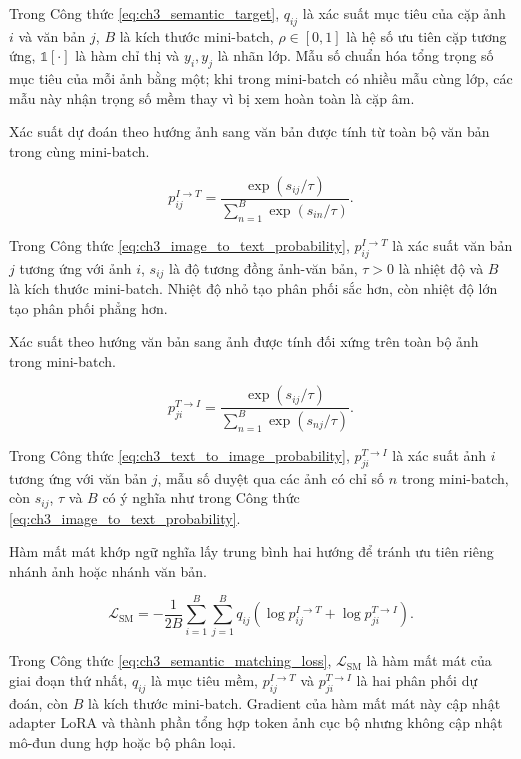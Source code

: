 Trong Công thức \ref{eq:ch3_semantic_target}, $q_{ij}$ là xác suất mục tiêu của cặp ảnh $i$ và văn bản $j$, $B$ là kích thước mini-batch, $\rho\in[0,1]$ là hệ số ưu tiên cặp tương ứng, $\mathbb{1}[\cdot]$ là hàm chỉ thị và $y_i,y_j$ là nhãn lớp. Mẫu số chuẩn hóa tổng trọng số mục tiêu của mỗi ảnh bằng một; khi trong mini-batch có nhiều mẫu cùng lớp, các mẫu này nhận trọng số mềm thay vì bị xem hoàn toàn là cặp âm.

Xác suất dự đoán theo hướng ảnh sang văn bản được tính từ toàn bộ văn bản trong cùng mini-batch.

\begin{equation}p_{ij}^{I\rightarrow T}=\frac{\exp\left(s_{ij}/\tau\right)}{\sum_{n=1}^{B}\exp\left(s_{in}/\tau\right)}.\label{eq:ch3_image_to_text_probability}\end{equation}

Trong Công thức \ref{eq:ch3_image_to_text_probability}, $p_{ij}^{I\rightarrow T}$ là xác suất văn bản $j$ tương ứng với ảnh $i$, $s_{ij}$ là độ tương đồng ảnh-văn bản, $\tau>0$ là nhiệt độ và $B$ là kích thước mini-batch. Nhiệt độ nhỏ tạo phân phối sắc hơn, còn nhiệt độ lớn tạo phân phối phẳng hơn.

Xác suất theo hướng văn bản sang ảnh được tính đối xứng trên toàn bộ ảnh trong mini-batch.

\begin{equation}p_{ji}^{T\rightarrow I}=\frac{\exp\left(s_{ij}/\tau\right)}{\sum_{n=1}^{B}\exp\left(s_{nj}/\tau\right)}.\label{eq:ch3_text_to_image_probability}\end{equation}

Trong Công thức \ref{eq:ch3_text_to_image_probability}, $p_{ji}^{T\rightarrow I}$ là xác suất ảnh $i$ tương ứng với văn bản $j$, mẫu số duyệt qua các ảnh có chỉ số $n$ trong mini-batch, còn $s_{ij}$, $\tau$ và $B$ có ý nghĩa như trong Công thức \ref{eq:ch3_image_to_text_probability}.

Hàm mất mát khớp ngữ nghĩa lấy trung bình hai hướng để tránh ưu tiên riêng nhánh ảnh hoặc nhánh văn bản.

\begin{equation}\mathcal{L}_{\mathrm{SM}}=-\frac{1}{2B}\sum_{i=1}^{B}\sum_{j=1}^{B}q_{ij}\left(\log p_{ij}^{I\rightarrow T}+\log p_{ji}^{T\rightarrow I}\right).\label{eq:ch3_semantic_matching_loss}\end{equation}

Trong Công thức \ref{eq:ch3_semantic_matching_loss}, $\mathcal{L}_{\mathrm{SM}}$ là hàm mất mát của giai đoạn thứ nhất, $q_{ij}$ là mục tiêu mềm, $p_{ij}^{I\rightarrow T}$ và $p_{ji}^{T\rightarrow I}$ là hai phân phối dự đoán, còn $B$ là kích thước mini-batch. Gradient của hàm mất mát này cập nhật adapter LoRA và thành phần tổng hợp token ảnh cục bộ nhưng không cập nhật mô-đun dung hợp hoặc bộ phân loại.

